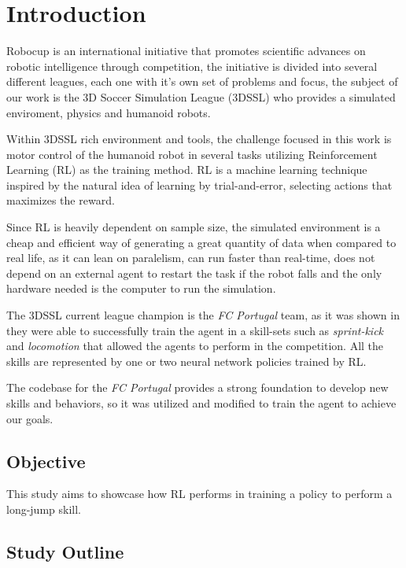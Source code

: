 \chapter{Introduction}





Robocup is an international initiative that promotes scientific advances on robotic intelligence through competition, the initiative is divided into several different leagues, each one with it's own set of problems and focus, the subject of our work is the 3D Soccer Simulation League (3DSSL) who provides a simulated enviroment, physics and humanoid robots.

Within 3DSSL rich environment and tools, the challenge focused in this work is motor control of the humanoid robot in several tasks utilizing Reinforcement Learning (RL) as the training method. RL is a machine learning technique inspired by the natural idea of learning by trial-and-error, selecting actions that maximizes the reward.

Since RL is heavily dependent on sample size, the simulated environment is a cheap and efficient way of generating a great quantity of data when compared to real life, as it can lean on paralelism, can run faster than real-time, does not depend on an external agent to restart the task if the robot falls and the only hardware needed is the computer to run the simulation.

The 3DSSL current league champion is the \emph{FC Portugal} team, as it was shown in \cite[]{abreu2023designing} they were able to successfully train the agent in a skill-sets such as \emph{sprint-kick} and \emph{locomotion} that allowed the agents to perform in the competition. All the skills are represented by one or two neural network policies trained by RL.

The codebase for the \emph{FC Portugal} provides a strong foundation to develop new skills and behaviors, so it was utilized and modified to train the agent to achieve our goals.


\section{Objective}

This study aims to showcase how RL performs in training a policy to perform a long-jump skill.

\section{Study Outline}
